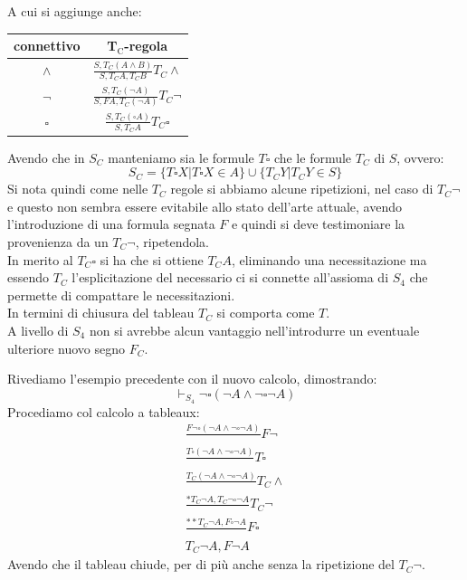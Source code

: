 \documentclass[a4paper,12pt, oneside]{book}
\begin{document}
A cui si aggiunge anche:
\begin{table}[H]
  \Large
  \centering
  \begin{tabular}{c||c}
    connettivo& T$_{\mbox{C}}$-regola\\
    \hline
    \hline
    $\land$ & $\frac{S,T_C(A\land B)}{S,T_CA,T_CB}T_C\land$\\
    \hline
    $\neg$ & $\frac{S,T_C(\neg A)}{S,FA,T_C(\neg A)}T_C\neg$\\
    \hline
    $\square$ & $\frac{S,T_C(\square A)}{S,T_CA}T_C\square$
  \end{tabular}
\end{table}
Avendo che in $S_C$ manteniamo sia le formule $T\square$ che le formule $T_C$ di
$S$, ovvero:
\[S_C=\{T\square X|T\square X\in A\}\cup\{T_CY|T_CY\in S\}\]
Si nota quindi come nelle $T_C$ regole si abbiamo alcune ripetizioni, nel caso
di $T_C\neg$ e questo non sembra essere evitabile allo stato dell'arte
attuale, avendo l'introduzione di una formula segnata $F$ e quindi si deve
testimoniare la provenienza da un $T_C\neg$, ripetendola.\\
In merito al $T_C\square$ si ha che si ottiene $T_CA$, eliminando una
necessitazione ma essendo $T_C$ l'esplicitazione del necessario ci si connette
all'assioma di $S_4$ che permette di compattare le necessitazioni.\\
In termini di chiusura del tableau $T_C$ si comporta come $T$.\\
A livello di $S_4$ non si avrebbe alcun vantaggio nell'introdurre un eventuale
ulteriore nuovo segno $F_C$.
\begin{esempio}
  Rivediamo l'esempio precedente con il nuovo calcolo, dimostrando:
  \[\vdash_{S_4}\neg\square(\neg A\land \neg \square\neg A)\]
  Procediamo col calcolo a tableaux:
  \begin{gather*}
    \frac{F\neg\square(\neg A\land \neg \square\neg A)}{}F\neg\\
    \frac{T\square(\neg A\land \neg \square\neg A)}{}T\square\\
    \frac{T_C(\neg A\land \neg \square\neg A)}{}T_C\land\\
    \frac{*T_C\neg A, T_C\neg\square\neg A}{}T_C\neg\\
    \frac{**T_C\neg A, F\square\neg A}{}F\square\\
    T_C\neg A,F\neg A
  \end{gather*}
  Avendo che il tableau chiude, per di più anche senza la ripetizione del
  $T_C\neg$. 
\end{esempio}
\end{document}
